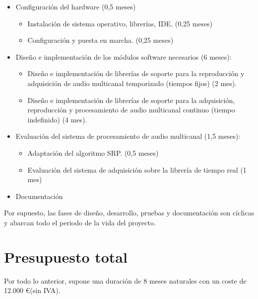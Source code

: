 \begin{itemize}
  \item Configuración del hardware (0,5 meses)
  
  \begin{itemize}
    \item Instalación de sistema operativo, librerías, IDE. (0,25 meses)
    \item Configuración y puesta en marcha. (0,25 meses)
  \end{itemize}
  
\item Diseño e implementación de los módulos software necesarios (6 meses):
  
  \begin{itemize}
    
  \item Diseño e implementación de librerías de soporte para la
    reproducción y adquisición de audio multicanal temporizado (tiempos
    fijos) (2 mes).
    
  \item Diseño e implementación de librerías de soporte para la
    adquisición, reproducción y procesamiento de audio multicanal
    continuo (tiempo indefinido) (4 mes).
    
  \end{itemize}
  

\item Evaluación del sistema de procesamiento de audio multicanal (1,5 meses):
  
  \begin{itemize}
    
  \item Adaptación del algoritmo SRP. (0,5 meses)
  
  \item Evaluación del sistema de adquisición sobre la librería de tiempo real (1 mes)
    
    \end{itemize}
  
\item Documentación

\end{itemize}

Por supuesto, las fases de diseño, desarrollo, pruebas y documentación
son cíclicas y abarcan todo el periodo de la vida del proyecto.


\section{Presupuesto total}

Por todo lo anterior, supone una duración de 8 meses naturales con un coste de 12.000 \euro (sin IVA).

